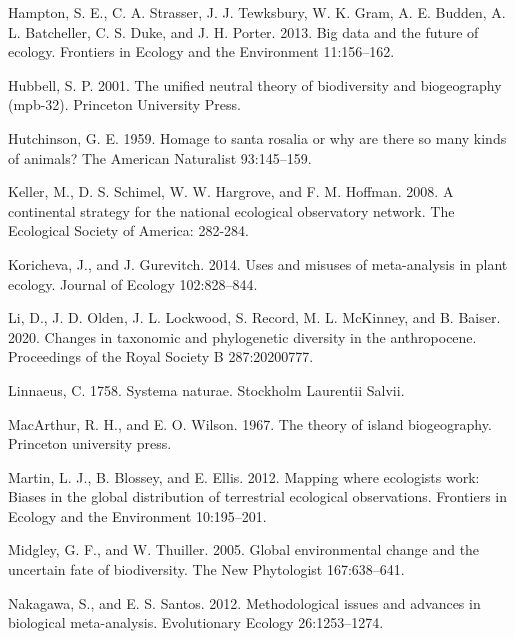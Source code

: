 \documentclass[
  12pt,
]{article}
\newlength{\cslhangindent}
\newenvironment{cslreferences}%
  {\setlength{\parindent}{0pt}%
  \everypar{\setlength{\hangindent}{\cslhangindent}}\ignorespaces}%
  {\par}
\begin{document}
\begin{cslreferences}
\leavevmode\hypertarget{ref-hampton2013big}{}%
Hampton, S. E., C. A. Strasser, J. J. Tewksbury, W. K. Gram, A. E. Budden, A. L. Batcheller, C. S. Duke, and J. H. Porter. 2013. Big data and the future of ecology. Frontiers in Ecology and the Environment 11:156--162.

\leavevmode\hypertarget{ref-hubbell2001unified}{}%
Hubbell, S. P. 2001. The unified neutral theory of biodiversity and biogeography (mpb-32). Princeton University Press.

\leavevmode\hypertarget{ref-hutchinson1959homage}{}%
Hutchinson, G. E. 1959. Homage to santa rosalia or why are there so many kinds of animals? The American Naturalist 93:145--159.

\leavevmode\hypertarget{ref-keller2008continental}{}%
Keller, M., D. S. Schimel, W. W. Hargrove, and F. M. Hoffman. 2008. A continental strategy for the national ecological observatory network. The Ecological Society of America: 282-284.

\leavevmode\hypertarget{ref-koricheva2014uses}{}%
Koricheva, J., and J. Gurevitch. 2014. Uses and misuses of meta-analysis in plant ecology. Journal of Ecology 102:828--844.

\leavevmode\hypertarget{ref-li2020changes}{}%
Li, D., J. D. Olden, J. L. Lockwood, S. Record, M. L. McKinney, and B. Baiser. 2020. Changes in taxonomic and phylogenetic diversity in the anthropocene. Proceedings of the Royal Society B 287:20200777.

\leavevmode\hypertarget{ref-linnaeus1758systema}{}%
Linnaeus, C. 1758. Systema naturae. Stockholm Laurentii Salvii.

\leavevmode\hypertarget{ref-macarthur1967theory}{}%
MacArthur, R. H., and E. O. Wilson. 1967. The theory of island biogeography. Princeton university press.

\leavevmode\hypertarget{ref-martin2012mapping}{}%
Martin, L. J., B. Blossey, and E. Ellis. 2012. Mapping where ecologists work: Biases in the global distribution of terrestrial ecological observations. Frontiers in Ecology and the Environment 10:195--201.

\leavevmode\hypertarget{ref-midgley2005global}{}%
Midgley, G. F., and W. Thuiller. 2005. Global environmental change and the uncertain fate of biodiversity. The New Phytologist 167:638--641.

\leavevmode\hypertarget{ref-nakagawa2012methodological}{}%
Nakagawa, S., and E. S. Santos. 2012. Methodological issues and advances in biological meta-analysis. Evolutionary Ecology 26:1253--1274.


\end{cslreferences}
\end{document}
